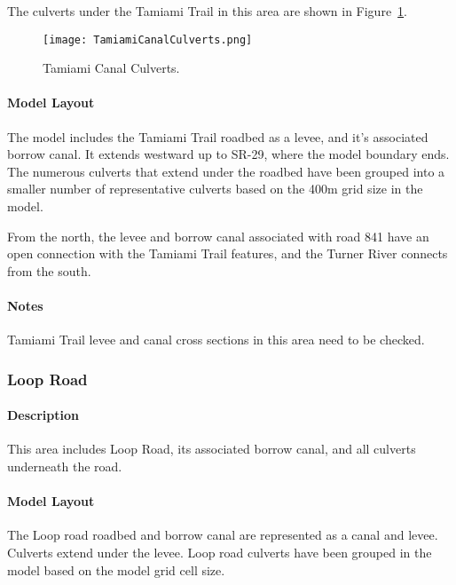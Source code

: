 The culverts under the Tamiami Trail in this area are shown in Figure~\ref{fig:TamiamiCanalCulverts}.

\begin{figure}[!h]
  \begin{center}
  \texttt{[image: TamiamiCanalCulverts.png]}
  \caption{Tamiami Canal Culverts.}
  \label{fig:TamiamiCanalCulverts}
  \end{center}
\end{figure}

\paragraph{Model Layout}
The model includes the Tamiami Trail roadbed as a levee, and it's associated borrow canal. It extends westward up to SR-29, where the model boundary ends.
The numerous culverts that extend under the roadbed have been grouped into a smaller number of representative culverts based on the 400m grid size in the model.

From the north, the levee and borrow canal associated with road 841 have an open connection with the Tamiami Trail features, and the Turner River connects from the south.




\begin{notes}
\paragraph{Notes}
Tamiami Trail levee and canal cross sections in this area need to be checked.
\end{notes}


\clearpage

\subsubsection{Loop Road}
\paragraph{Description}
This area includes Loop Road, its associated borrow canal, and all culverts underneath the road.

\paragraph{Model Layout}
The Loop road roadbed and borrow canal are represented as a canal and levee. Culverts extend under the levee.
Loop road culverts have been grouped in the model based on the model grid cell size.

